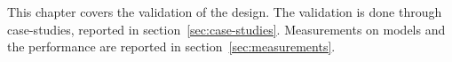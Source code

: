 This chapter covers the validation of the design. The validation is done through case-studies, reported in section~\ref{sec:case-studies}. Measurements on models and the performance are reported in section~\ref{sec:measurements}.

